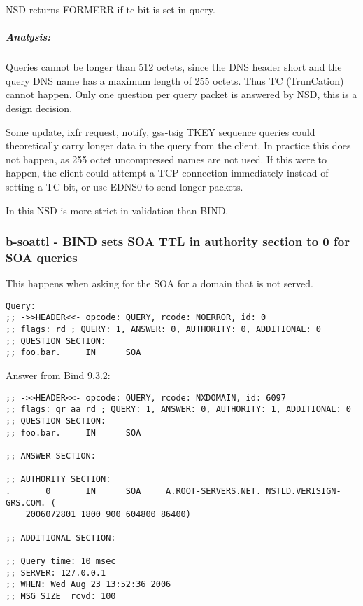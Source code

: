 \documentclass[twoside,titlepage,english]{nlnetlabs}
\begin{document}
NSD returns FORMERR if tc bit is set in query.

\vspace{-8pt}\subparagraph{Analysis:}

Queries cannot be longer than 512 octets, since the DNS header short
and the query DNS name has a maximum length of 255 octets. Thus 
TC (TrunCation) cannot happen. Only one question per query packet is 
answered by NSD, this is a design decision.

Some update, ixfr request, notify, gss-tsig TKEY sequence queries could 
theoretically carry longer data in the query from the client. In practice
this does not happen, as 255 octet uncompressed names are not used.
If this were to happen, the client could attempt a TCP connection
immediately instead of setting a TC bit, or use EDNS0 to send longer packets.

In this NSD is more strict in validation than BIND.


\subsubsection{b-soattl - BIND sets SOA TTL in authority section to 0 for SOA queries}
\label{b-soattl}

This happens when asking for the SOA for a domain that is not served.

\footnotesize
\begin{verbatim}
Query:
;; ->>HEADER<<- opcode: QUERY, rcode: NOERROR, id: 0
;; flags: rd ; QUERY: 1, ANSWER: 0, AUTHORITY: 0, ADDITIONAL: 0
;; QUESTION SECTION:
;; foo.bar.     IN      SOA
\end{verbatim}
\normalsize


Answer from Bind 9.3.2:

\footnotesize
\begin{verbatim}
;; ->>HEADER<<- opcode: QUERY, rcode: NXDOMAIN, id: 6097
;; flags: qr aa rd ; QUERY: 1, ANSWER: 0, AUTHORITY: 1, ADDITIONAL: 0
;; QUESTION SECTION:
;; foo.bar.     IN      SOA

;; ANSWER SECTION:

;; AUTHORITY SECTION:
.       0       IN      SOA     A.ROOT-SERVERS.NET. NSTLD.VERISIGN-GRS.COM. (
	2006072801 1800 900 604800 86400)

;; ADDITIONAL SECTION:

;; Query time: 10 msec
;; SERVER: 127.0.0.1
;; WHEN: Wed Aug 23 13:52:36 2006
;; MSG SIZE  rcvd: 100
\end{verbatim}
\normalsize
\end{document}

